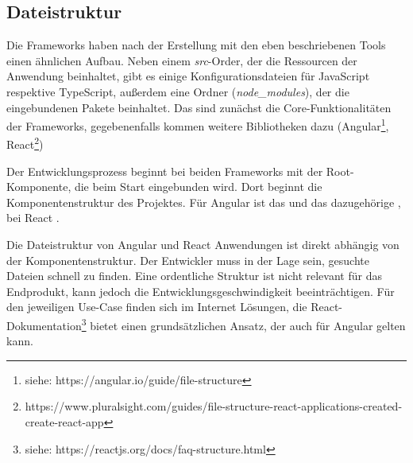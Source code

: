 \subsection{Dateistruktur}
Die Frameworks haben nach der Erstellung mit den eben beschriebenen Tools einen ähnlichen Aufbau. Neben einem \textit{src}-Order, der die Ressourcen der Anwendung beinhaltet, gibt es einige Konfigurationsdateien für JavaScript respektive TypeScript, außerdem eine Ordner (\textit{node\_modules}), der die eingebundenen Pakete beinhaltet. Das sind zunächst die Core-Funktionalitäten der Frameworks, gegebenenfalls kommen weitere Bibliotheken dazu (Angular\footnote{siehe: https://angular.io/guide/file-structure}, React\footnote{https://www.pluralsight.com/guides/file-structure-react-applications-created-create-react-app})

Der Entwicklungsprozess beginnt bei beiden Frameworks mit der Root-Komponente, die beim Start eingebunden wird. Dort beginnt die Komponentenstruktur des Projektes. Für Angular ist das  und das dazugehörige , bei React .

Die Dateistruktur von Angular und React Anwendungen ist direkt abhängig von der Komponentenstruktur. Der Entwickler muss in der Lage sein, gesuchte Dateien schnell zu finden. Eine ordentliche Struktur ist nicht relevant für das Endprodukt, kann jedoch die Entwicklungsgeschwindigkeit beeinträchtigen. Für den jeweiligen Use-Case finden sich im Internet Lösungen, die React-Dokumentation\footnote{siehe: https://reactjs.org/docs/faq-structure.html} bietet einen grundsätzlichen Ansatz, der auch für Angular gelten kann.
